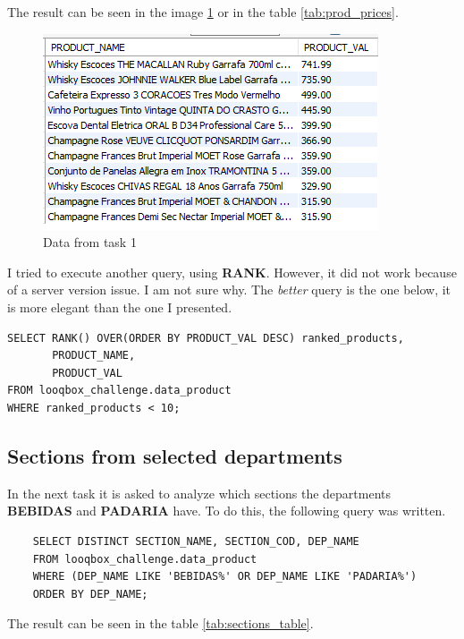 \documentclass[a4paper, 12pt]{article}
\begin{document}
The result can be seen in the image \ref{fig_texto_jogo} or in the table \ref{tab:prod_prices}.

\begin{figure}[htb]
	\caption{\label{fig_texto_jogo} Data from task 1}
	\begin{center}
		\includegraphics[scale=1.10]{task_1_sql.PNG}
	\end{center}
\end{figure}


\newpage

I tried to execute another query, using \textbf{RANK}. However, it did not work because of a server version issue. I am not sure why. The \textit{better} query is the one below, it is more elegant than the one I presented.

\begin{verbatim}
SELECT RANK() OVER(ORDER BY PRODUCT_VAL DESC) ranked_products,
       PRODUCT_NAME,
       PRODUCT_VAL
FROM looqbox_challenge.data_product
WHERE ranked_products < 10;
\end{verbatim}
\newpage
\subsection{Sections from selected departments}

In the next task it is asked to analyze which sections the departments \textbf{BEBIDAS} and \textbf{PADARIA} have. To do this, the following query was written.

\begin{verbatim}
    SELECT DISTINCT SECTION_NAME, SECTION_COD, DEP_NAME
    FROM looqbox_challenge.data_product
    WHERE (DEP_NAME LIKE 'BEBIDAS%' OR DEP_NAME LIKE 'PADARIA%')
    ORDER BY DEP_NAME;
\end{verbatim}

The result can be seen in the table \ref{tab:sections_table}.
\end{document}
